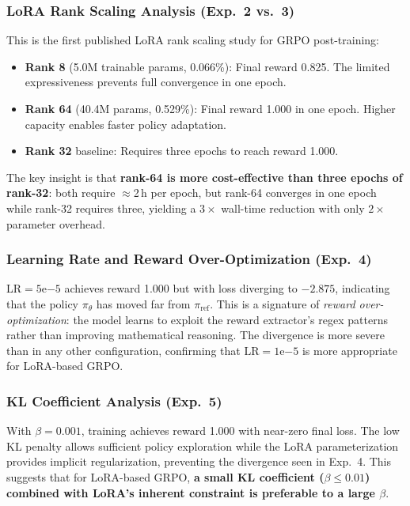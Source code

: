 \documentclass{ieeeaccess}
\begin{document}
\subsubsection{LoRA Rank Scaling Analysis (Exp.~2 vs.~3)}
This is the first published LoRA rank scaling study for GRPO post-training:
\begin{itemize}
\item \textbf{Rank 8} (5.0M trainable params, 0.066\%): Final reward 0.825.
  The limited expressiveness prevents full convergence in one epoch.
\item \textbf{Rank 64} (40.4M params, 0.529\%): Final reward 1.000 in one epoch.
  Higher capacity enables faster policy adaptation.
\item \textbf{Rank 32} baseline: Requires three epochs to reach reward 1.000.
\end{itemize}
The key insight is that \textbf{rank-64 is more cost-effective than three epochs of rank-32}:
both require $\approx$2\,h per epoch, but rank-64 converges in one epoch while rank-32 requires three,
yielding a $3\times$ wall-time reduction with only $2\times$ parameter overhead.

\subsubsection{Learning Rate and Reward Over-Optimization (Exp.~4)}
LR$=5\mathrm{e}{-5}$ achieves reward 1.000 but with loss diverging to $-2.875$,
indicating that the policy $\pi_\theta$ has moved far from $\pi_{\mathrm{ref}}$.
This is a signature of \textit{reward over-optimization}: the model learns to exploit
the reward extractor's regex patterns rather than improving mathematical reasoning.
The divergence is more severe than in any other configuration, confirming that
$\mathrm{LR}=1\mathrm{e}{-5}$ is more appropriate for LoRA-based GRPO.

\subsubsection{KL Coefficient Analysis (Exp.~5)}
With $\beta=0.001$, training achieves reward 1.000 with near-zero final loss.
The low KL penalty allows sufficient policy exploration while the LoRA parameterization
provides implicit regularization, preventing the divergence seen in Exp.~4.
This suggests that for LoRA-based GRPO, \textbf{a small KL coefficient ($\beta \leq 0.01$)
combined with LoRA's inherent constraint is preferable to a large $\beta$}.
\end{document}
